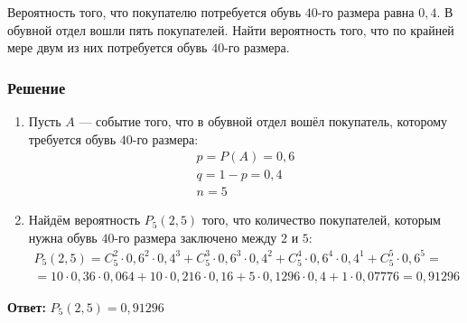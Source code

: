 \documentclass[14pt]{article}
\begin{document}
    Вероятность того, что покупателю потребуется обувь $40\text{-го}$ размера равна $0,4$.
    В обувной отдел вошли пять покупателей.
    Найти вероятность того, что по крайней мере двум из них потребуется обувь $40\text{-го}$ размера.

    \subsubsection*{Решение}

    \begin{enumerate}[wide, labelwidth=!, labelindent=0pt]
        \item Пусть $A$ --- событие того, что в обувной отдел вошёл покупатель, которому требуется обувь $40\text{-го}$ размера:
            \begin{gather*}
                p = P(A) = 0,6 \\
                q = 1 - p = 0,4 \\
                n = 5
            \end{gather*}
        \item Найдём вероятность $P_5(2, 5)$ того, что количество покупателей, которым нужна обувь $40\text{-го}$ размера заключено между $2$ и $5$:
            \begin{gather*}
                P_5(2, 5) = C_5^2 \cdot 0,6^2 \cdot 0,4^3 + C_5^3 \cdot 0,6^3 \cdot 0,4^2 + C_5^4 \cdot 0,6^4 \cdot 0,4^1 + C_5^5 \cdot 0,6^5 = \\
                = 10 \cdot 0,36 \cdot 0,064 + 10 \cdot 0,216 \cdot 0,16 + 5 \cdot 0,1296 \cdot 0,4 + 1 \cdot 0,07776 = 0,91296
            \end{gather*}
    \end{enumerate}
    \hspace{290pt}\textbf{Ответ:} $P_5(2, 5) = 0,91296$
\end{document}
